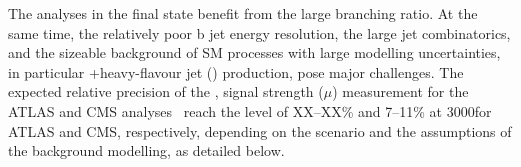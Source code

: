 
The \ttH analyses in the \Htobb final state benefit from the large branching ratio.
At the same time, the relatively poor b jet energy resolution, the large jet combinatorics, and the sizeable background of SM processes with large modelling uncertainties, in particular \ttbar+heavy-flavour jet (\ttHF) production, pose major challenges.
The expected relative precision of the \ttH, \Htobb signal strength ($\mu$) measurement for the ATLAS and CMS analyses~\cite{ATLAS-PHYS-PUB-2018-XY,CMS-PAS-FTR-18-011} reach the level of XX--XX\% and 7--11\% at 3000\Uifb for ATLAS and CMS, respectively, depending on the scenario and the assumptions of the \ttHF background modelling, as detailed below.

